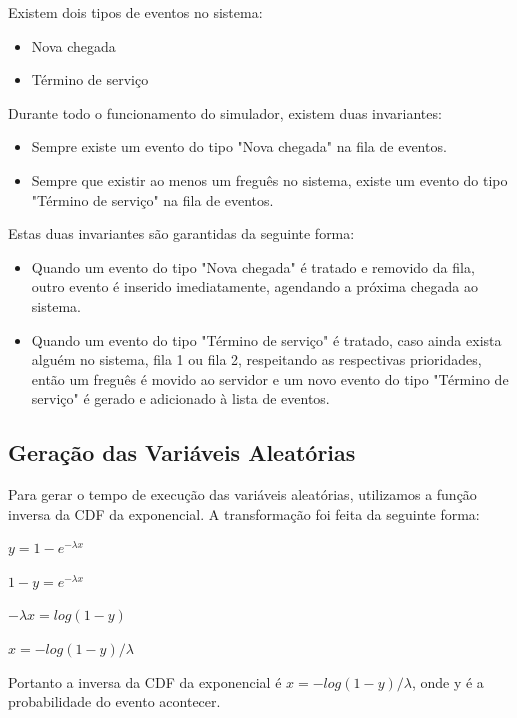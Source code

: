 \documentclass[a4paper,10pt]{article}
\begin{document}
	Existem dois tipos de eventos no sistema:
	\begin{itemize}
		\item Nova chegada
		\item Término de serviço
	\end{itemize}

	Durante todo o funcionamento do simulador, existem duas invariantes:
	\begin{itemize}
		\item Sempre existe um evento do tipo "Nova chegada" na fila de eventos.
		\item Sempre que existir ao menos um freguês no sistema, existe um evento do tipo "Término de serviço" na fila de eventos.
	\end{itemize}

	Estas duas invariantes são garantidas da seguinte forma:
	\begin{itemize}
		\item Quando um evento do tipo "Nova chegada" é tratado e removido da fila, outro evento é inserido imediatamente, agendando a próxima chegada ao sistema.
		\item Quando um evento do tipo "Término de serviço" é tratado, caso ainda exista alguém no sistema, fila 1 ou fila 2, respeitando as respectivas prioridades, então um freguês é movido ao servidor e um novo evento do tipo "Término de serviço" é gerado e adicionado à lista de eventos.
    \end{itemize}

\subsection{Geração das Variáveis Aleatórias}

	Para gerar o tempo de execução das variáveis aleatórias, utilizamos a função inversa da CDF da exponencial. A transformação foi feita da seguinte forma:

    $ y = 1 - e^{-\lambda x} $

    $ 1 - y  = e^{-\lambda x} $

    $ -\lambda x = log (1 - y) $

    $ x = -{log(1 - y)} / \lambda $

	Portanto a inversa da CDF da exponencial é $ x = -{log(1 - y)} / \lambda $, onde y é a probabilidade do evento acontecer.
\end{document}
